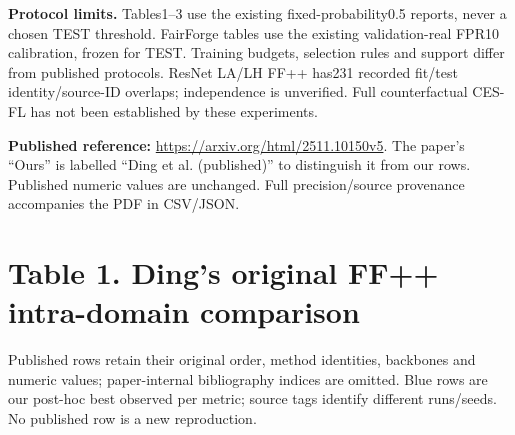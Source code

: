 \documentclass[10pt]{article}
\newcommand{\note}[1]{{\fontsize{8}{10}\selectfont #1\par}}
\begin{document}
\par\textbf{Protocol limits.} Tables1--3 use the existing fixed-probability0.5 reports, never a chosen TEST threshold.
FairForge tables use the existing validation-real FPR10 calibration, frozen for TEST.
Training budgets, selection rules and support differ from published protocols.
ResNet LA/LH FF++ has231 recorded fit/test identity/source-ID overlaps; independence is unverified.
Full counterfactual CES-FL has not been established by these experiments.
\par\textbf{Published reference:} \url{https://arxiv.org/html/2511.10150v5}.
The paper's ``Ours'' is labelled ``Ding et al. (published)'' to distinguish it from our rows.
Published numeric values are unchanged. Full precision/source provenance accompanies the PDF in CSV/JSON.

\clearpage\section*{Table 1. Ding's original FF++ intra-domain comparison}
\note{Published rows retain their original order, method identities, backbones and numeric values; paper-internal bibliography indices are omitted. Blue rows are our post-hoc best observed per metric; source tags identify different runs/seeds. No published row is a new reproduction.}
\end{document}
